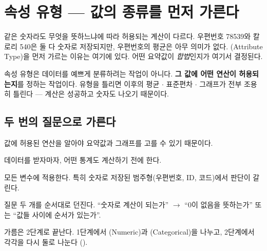 \chapter{속성 유형 --- 값의 종류를 먼저 가른다}
\label{ch:attributes}

같은 숫자라도 무엇을 뜻하느냐에 따라 허용되는 계산이 다르다. 우편번호
78539와 칼로리 540은 둘 다 숫자로 저장되지만, 우편번호의 평균은 아무 의미가
없다. (Attribute Type)을 먼저 가르는 이유는 여기에 있다.
어떤 요약값이 \emph{합법}인지가 여기서 결정된다.

\begin{keyidea}
속성 유형은 데이터를 예쁘게 분류하려는 작업이 아니다. \textbf{그 값에 어떤
연산이 허용되는지}를 정하는 작업이다. 유형을 틀리면 이후의 평균 $\cdot$ 표준편차
$\cdot$ 그래프가 전부 조용히 틀린다 --- 계산은 성공하고 숫자도 나오기 때문이다.
\end{keyidea}

\section{두 번의 질문으로 가른다}
\label{sec:attr-flow}

\begin{inbrief}
  \item[Why] 값에 허용된 연산을 알아야 요약값과 그래프를 고를 수 있기 때문이다.
  \item[When] 데이터를 받자마자, 어떤 통계도 계산하기 전에 한다.
  \item[Where] 모든 변수에 적용한다. 특히 숫자로 저장된 범주형(우편번호, ID,
               코드)에서 판단이 갈린다.
  \item[How] 질문 두 개를 순서대로 던진다. ``숫자로 계산이 되는가'' $\to$
             ``0이 없음을 뜻하는가'' 또는 ``값들 사이에 순서가 있는가''.
\end{inbrief}

가름은 2단계로 끝난다. 1단계에서 (Numeric)과
(Categorical)을 나누고, 2단계에서 각각을 다시 둘로 나눈다
().

